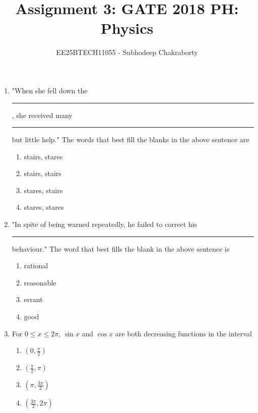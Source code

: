 \documentclass[journal,12pt,onecolumn]{IEEEtran}
\theoremstyle{remark}
\begin{document}

\vspace{3cm}

\title{Assignment 3: GATE 2018 PH: Physics}
\author{EE25BTECH11055 - Subhodeep Chakraborty}
\maketitle
\hrulefill
\bigskip

\renewcommand{\thefigure}{\theenumi}
\renewcommand{\thetable}{\theenumi}


\begin{enumerate}
    \item "When she fell down the \rule{1cm}{0.4pt}, she received many \rule{1cm}{0.4pt} but little help."
    The words that best fill the blanks in the above sentence are
    \hfill{} \begin{enumerate}
        \item stairs, stares
        \item stairs, stairs
        \item stares, stairs
        \item stares, stares
    \end{enumerate}

    \item "In spite of being warned repeatedly, he failed to correct his \rule{1cm}{0.4pt} behaviour."
    The word that best fills the blank in the above sentence is
    \hfill{} \begin{enumerate}
        \item rational
        \item reasonable
        \item errant
        \item good
    \end{enumerate}

    \item For $0 \le x \le 2\pi$, $\sin x$ and $\cos x$ are both decreasing functions in the interval
    \hfill{} \begin{enumerate}
        \item $(0, \frac{\pi}{2})$
        \item $(\frac{\pi}{2}, \pi)$
        \item $(\pi, \frac{3\pi}{2})$
        \item $(\frac{3\pi}{2}, 2\pi)$
    \end{enumerate}


\end{enumerate}
\end{document}
